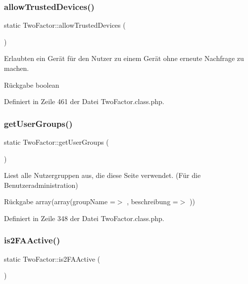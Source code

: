 \subsubsection{\texorpdfstring{allow\+Trusted\+Devices()}{allowTrustedDevices()}}
{\footnotesize\ttfamily static Two\+Factor\+::allow\+Trusted\+Devices (\begin{DoxyParamCaption}{ }\end{DoxyParamCaption})\hspace{0.3cm}{\ttfamily [static]}}

Erlaubten ein Gerät für den Nutzer zu einem Gerät ohne erneute Nachfrage zu machen. \begin{DoxyReturn}{Rückgabe}
boolean 
\end{DoxyReturn}


Definiert in Zeile 461 der Datei Two\+Factor.\+class.\+php.

\mbox{\label{class_two_factor_a857543b4b13473b7bf28a872688af62e}} 
\subsubsection{\texorpdfstring{get\+User\+Groups()}{getUserGroups()}}
{\footnotesize\ttfamily static Two\+Factor\+::get\+User\+Groups (\begin{DoxyParamCaption}{ }\end{DoxyParamCaption})\hspace{0.3cm}{\ttfamily [static]}}

Liest alle Nutzergruppen aus, die diese Seite verwendet. (Für die Benutzeradministration) \begin{DoxyReturn}{Rückgabe}
array(array(\textquotesingle{}group\+Name\textquotesingle{} =$>$ \textquotesingle{}\textquotesingle{}, \textquotesingle{}beschreibung\textquotesingle{} =$>$ \textquotesingle{}\textquotesingle{})) 
\end{DoxyReturn}


Definiert in Zeile 348 der Datei Two\+Factor.\+class.\+php.

\mbox{\label{class_two_factor_af534f03f27dd9f4806fb35e60c14608e}} 
\subsubsection{\texorpdfstring{is2\+F\+A\+Active()}{is2FAActive()}}
{\footnotesize\ttfamily static Two\+Factor\+::is2\+F\+A\+Active (\begin{DoxyParamCaption}{ }\end{DoxyParamCaption})\hspace{0.3cm}{\ttfamily [static]}}


